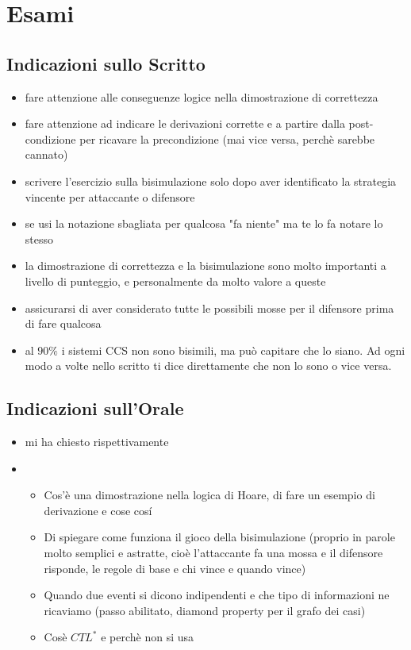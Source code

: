 \chapter{Esami}

\section{Indicazioni sullo Scritto}

\begin{itemize}
  \item fare attenzione alle conseguenze logice nella dimostrazione di correttezza
  \item fare attenzione ad indicare le derivazioni corrette e a partire dalla post-condizione per ricavare la precondizione (mai vice versa, perch\`e sarebbe cannato)
  \item scrivere l'esercizio sulla bisimulazione solo dopo aver identificato la strategia vincente per attaccante o difensore
  \item se usi la notazione sbagliata per qualcosa "fa niente" ma te lo fa notare lo stesso
  \item la dimostrazione di correttezza e la bisimulazione sono molto importanti a livello di punteggio, e personalmente da molto valore a queste
  \item assicurarsi di aver considerato tutte le possibili mosse per il difensore prima di fare qualcosa
  \item al $90\%$ i sistemi CCS non sono bisimili, ma pu\`o capitare che lo siano. Ad ogni modo a volte nello scritto ti dice direttamente che non lo sono o vice versa.
\end{itemize}

\section{Indicazioni sull'Orale}

\begin{itemize}
  \item mi ha chiesto rispettivamente
  \item \begin{itemize}
    \item Cos'\`e una dimostrazione nella logica di Hoare, di fare un esempio di derivazione e cose cos\'i
    \item Di spiegare come funziona il gioco della bisimulazione (proprio in parole molto semplici e astratte, cio\`e l'attaccante fa una mossa e il difensore risponde, le regole di base e chi vince e quando vince)
    \item Quando due eventi si dicono indipendenti e che tipo di informazioni ne ricaviamo (passo abilitato, diamond property per il grafo dei casi)
    \item Cos\`e $CTL^\ast$ e perch\`e non si usa
  \end{itemize}
\end{itemize}

